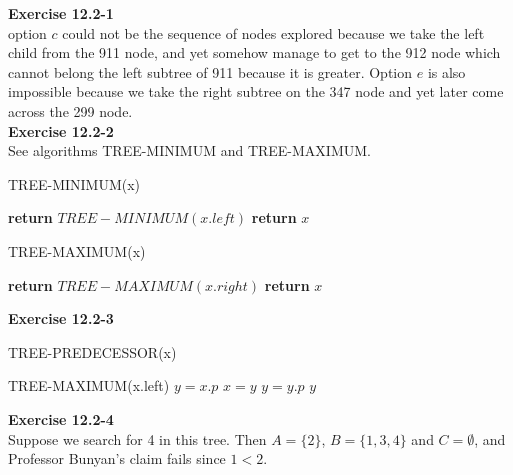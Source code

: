 \documentclass{article}
\begin{document}
\noindent\textbf{ Exercise 12.2-1} \\

option $c$ could not be the sequence of nodes explored because we take the left child from the 911 node, and yet somehow manage to get to the 912 node which cannot belong the left subtree of 911 because it is greater. Option $e$ is also impossible because we take the right subtree on the 347 node and yet later come across the 299 node.\\

\noindent\textbf{Exercise 12.2-2}\\

See algorithms TREE-MINIMUM and TREE-MAXIMUM. \\

\begin{algorithm}
\caption{TREE-MINIMUM(x)}
\begin{algorithmic}
	\State \textbf{return} $TREE-MINIMUM(x.left)$
\Else
\State \textbf{return} $x$
\EndIf
\end{algorithmic}
\end{algorithm}

\begin{algorithm}
\caption{TREE-MAXIMUM(x)}
\begin{algorithmic}
	\State \textbf{return} $TREE-MAXIMUM(x.right)$
\Else
\State \textbf{return} $x$
\EndIf
\end{algorithmic}
\end{algorithm}

\noindent\textbf{ Exercise 12.2-3} \\

\begin{algorithm}
\caption{TREE-PREDECESSOR(x)}
\begin{algorithmic}
\State \Return TREE-MAXIMUM(x.left)
\EndIf
\State $y = x.p$
\State $x=y$
\State $y=  y.p$
\EndWhile
\State\Return $y$
\end{algorithmic}
\end{algorithm}

\noindent\textbf{Exercise 12.2-4}\\

Suppose we search for 4 in this tree.  Then $A = \{2\}$, $B = \{1,3,4\}$ and $C = \emptyset$, and Professor Bunyan's claim fails since $1 < 2$.

\end{document}
